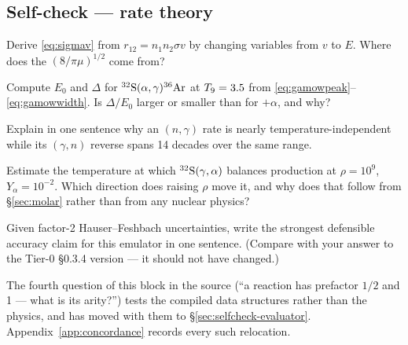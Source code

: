 \subsection*{Self-check --- rate theory}
\label{sec:selfcheck-ratetheory}

\begin{selfcheck}
\item Derive \eqref{eq:sigmav} from $r_{12} = n_1n_2\sigma v$ by changing
      variables from $v$ to $E$. Where does the $(8/\pi\mu)^{1/2}$ come from?
\item Compute $E_0$ and $\Delta$ for
      $\nuc{S}{32}(\alpha,\gamma)\nuc{Ar}{36}$ at $\Tn = 3.5$ from
      \eqref{eq:gamowpeak}--\eqref{eq:gamowwidth}. Is $\Delta/E_0$ larger or
      smaller than for $+\alpha$, and why?
\item Explain in one sentence why an $(n,\gamma)$ rate is nearly
      temperature-independent while its $(\gamma,n)$ reverse spans 14 decades
      over the same range.
\item Estimate the temperature at which $\nuc{S}{32}(\gamma,\alpha)$ balances
       production at $\rho = 10^9$, $Y_\alpha = 10^{-2}$. Which
      direction does raising $\rho$ move it, and why does that follow from
      \S\ref{sec:molar} rather than from any nuclear physics?
\item Given factor-2 Hauser--Feshbach uncertainties, write the strongest
      defensible accuracy claim for this emulator in one sentence. (Compare with
      your answer to the Tier-0 \S0.3.4 version --- it should not have changed.)
\end{selfcheck}

\begin{aside}
The fourth question of this block in the source (``a reaction has prefactor
$1/2$ and  1 --- what is its arity?'') tests the compiled data
structures rather than the physics, and has moved with them to
\S\ref{sec:selfcheck-evaluator}. Appendix~\ref{app:concordance} records every
such relocation.
\end{aside}
